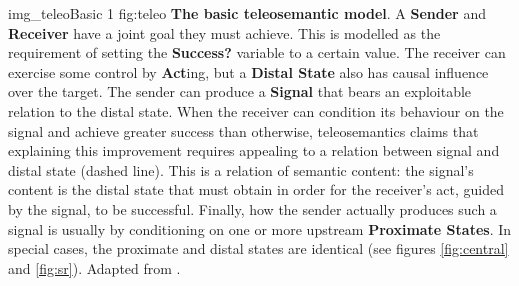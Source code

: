 \begin{myfig}
    {img_teleoBasic} %
    {1} %
    {fig:teleo} %
    {\textbf{The basic teleosemantic model}. 
    A \textbf{Sender} and \textbf{Receiver} have a joint goal they must achieve. 
    This is modelled as the requirement of setting the \textbf{Success?} variable to a certain value. 
    The receiver can exercise some control by \textbf{Act}ing, but a \textbf{Distal State} also has causal influence over the target. 
    The sender can produce a \textbf{Signal} that bears an exploitable relation to the distal state.
    When the receiver can condition its behaviour on the signal and achieve greater success than otherwise, teleosemantics claims that explaining this improvement requires appealing to a relation between signal and distal state (dashed line).
    This is a relation of semantic content: the signal's content is the distal state that must obtain in order for the receiver's act, guided by the signal, to be successful.
    Finally, how the sender actually produces such a signal is usually by conditioning on one or more upstream \textbf{Proximate States}.
    In special cases, the proximate and distal states are identical (see figures \ref{fig:central} and \ref{fig:sr}).
    Adapted from \citet[fig. 6.3, p. 78]{millikan2004varieties}.
    } %
\end{myfig}